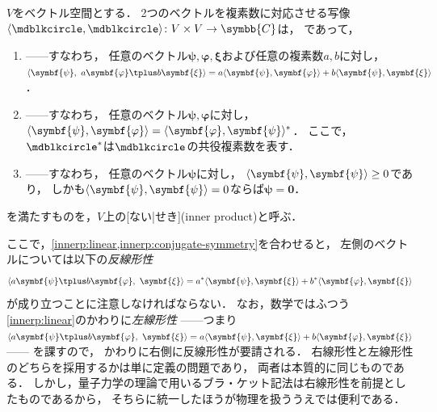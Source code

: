 \documentclass[
]{sotsu}
\newcommand{\bpsi}{\symbf{\psi}}
\newcommand{\bphi}{\symbf{\varphi}}
\newcommand{\bxi}{\symbf{\xi}}
\newcommand{\fire}[1]{\textcolor{fire}{#1}}
\begin{document}
$V$をベクトル空間とする．
2つのベクトルを複素数に対応させる写像$\iparen{\bigdot, \bigdot} \colon V \times V \to \symbb{C}$は，
であって，
\begin{enumerate}
    \item \label{innerp:linear} 
        ------すなわち，
        \fire{任意のベクトル$\bpsi, \bphi, \bxi$}および\fire{任意の複素数$a, b$}に対し，
        $\iparen{\bpsi, \  a \bphi \vecplus b \bxi} = a \iparen{\bpsi, \bphi} + b \iparen{\bpsi, \bxi}$．
    \item \label{innerp:conjugate-symmetry} 
        ------すなわち，
        \fire{任意のベクトル$\bpsi, \bphi$}に対し，
        $\iparen{\bpsi, \bphi} = \conj{\iparen{\bphi, \bpsi}}$．
        ここで，$\conj{\bigdot}$は$\bigdot$の共役複素数を表す．
    \item \label{innerp:positive-definiteness}
        ------すなわち，
        \fire{任意のベクトル$\bpsi$}に対し，
        $\iparen{\bpsi, \bpsi} \geq 0$であり，
        しかも$\iparen{\bpsi, \bpsi} = 0$ならば$\bpsi = \symbf{0}$．
\end{enumerate}
を満たすものを，$V$上の[ない|せき](inner product)と呼ぶ．

ここで，\cref*{innerp:linear,innerp:conjugate-symmetry}を合わせると，
左側のベクトルについては以下の\emph{反線形性}
\begin{equation}
    \label{eq:anti-linear}
    \iparen{a \bpsi \vecplus b \bphi, \  \bxi}
        = \conj{a} \iparen{\bpsi, \bxi} + \conj{b} \iparen{\bphi, \bxi}
\end{equation}
が成り立つことに注意しなければならない．
なお，数学ではふつう\cref{innerp:linear}のかわりに\emph{左線形性}%
------つまり\(
    \iparen{a \bpsi \vecplus b \bphi, \  \bxi}
    = a \iparen{\bpsi, \bxi} + b \iparen{\bphi, \bxi}
\)------%
を課すので，
かわりに右側に反線形性が要請される．
右線形性と左線形性のどちらを採用するかは単に定義の問題であり，
両者は本質的に同じものである．
しかし，量子力学の理論で用いるブラ・ケット記法は右線形性を前提としたものであるから，
そちらに統一したほうが物理を扱ううえでは便利である．
\end{document}
